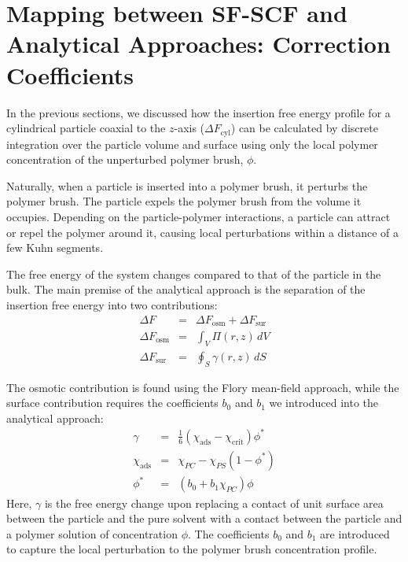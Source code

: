 \documentclass[10pt, a4paper]{article}
\begin{document}
\section{Mapping between SF-SCF and Analytical Approaches: Correction Coefficients}
\begin{multicols}{2}

In the previous sections, we discussed how the insertion free energy profile for a cylindrical particle coaxial to the $z$-axis ($\Delta F_{\text{cyl}}$) can be calculated by discrete integration over the particle volume and surface using only the local polymer concentration of the unperturbed polymer brush, $\phi$.

Naturally, when a particle is inserted into a polymer brush, it perturbs the polymer brush.
The particle expels the polymer brush from the volume it occupies.
Depending on the particle-polymer interactions, a particle can attract or repel the polymer around it, causing local perturbations within a distance of a few Kuhn segments.

The free energy of the system changes compared to that of the particle in the bulk.
The main premise of the analytical approach is the separation of the insertion free energy into two contributions:
\begin{eqnarray}
    \label{eq:Delta_F} \Delta F &=& \Delta F_{\text{osm}} + \Delta F_{\text{sur}} \\
    \label{eq:Delta_F_V} \Delta F_{\text{osm}} &=& \int_{V} \Pi(r, z) \, dV \\
    \label{eq:Delta_F_S} \Delta F_{\text{sur}} &=& \oint_{S} \gamma(r, z) \, dS
\end{eqnarray}

The osmotic contribution is found using the Flory mean-field approach, while the surface contribution requires the coefficients $b_0$ and $b_1$ we introduced into the analytical approach:
\begin{eqnarray}
    \gamma &=& \frac{1}{6} (\chi_{\text{ads}} - \chi_{\text{crit}}) \phi^{\ast} \\
    \chi_{\text{ads}} &=& \chi_{PC} - \chi_{PS} (1 - \phi^{\ast}) \\
    \phi^{\ast} &=& (b_0 + b_1 \chi_{PC}) \phi \label{eq:phi_correction}
\end{eqnarray}
Here, $\gamma$ is the free energy change upon replacing a contact of unit surface area between the particle and the pure solvent with a contact between the particle and a polymer solution of concentration $\phi$.
The coefficients $b_0$ and $b_1$ are introduced to capture the local perturbation to the polymer brush concentration profile.


\end{multicols}
\end{document}
